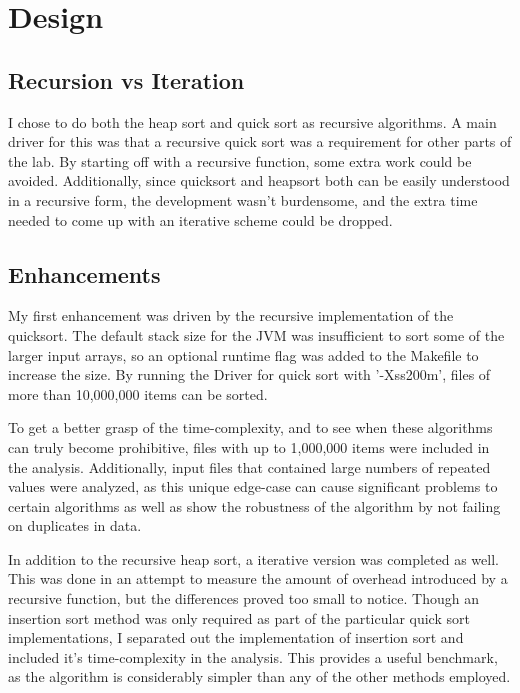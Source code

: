 \documentclass[a4paper,12pt]{article}
\begin{document}

\section{Design}
\subsection{Recursion vs Iteration}
I chose to do both the heap sort and quick sort as recursive algorithms.  A main driver for this was that a recursive quick sort was a requirement for other parts of the lab.  By starting off with a recursive function, some extra work could be avoided.  Additionally, since quicksort and heapsort both can be easily understood in a recursive form, the development wasn't burdensome, and the extra time needed to come up with an iterative scheme could be dropped.


\subsection{Enhancements}
My first enhancement was driven by the recursive implementation of the quicksort.  The default stack size for the JVM was insufficient  to sort some of the larger input arrays, so an optional runtime flag was added to the Makefile to increase the size.  By running the Driver for quick sort with '-Xss200m', files of more than 10,000,000 items can be sorted.  

To get a better grasp of the time-complexity, and to see when these algorithms can truly become prohibitive, files with up to 1,000,000 items were included in the analysis.  Additionally, input files that contained large numbers of repeated values were analyzed, as this unique edge-case can cause significant problems to certain algorithms as well as show the robustness of the algorithm by not failing on duplicates in data. 

In addition to the recursive heap sort, a iterative version was completed as well.  This was done in an attempt to measure the amount of overhead introduced by a recursive function, but the differences proved too small to notice.  Though an insertion sort method was only required as part of the particular quick sort implementations, I separated out the implementation of insertion sort and included it's time-complexity in the analysis.  This provides a useful benchmark, as the algorithm is considerably simpler than any of the other methods employed.
\end{document}

